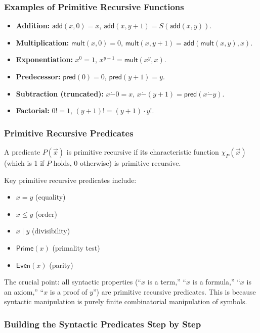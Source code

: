 \subsubsection*{Examples of Primitive Recursive Functions}

\begin{itemize}
\item \textbf{Addition:} $\mathsf{add}(x, 0) = x$, $\mathsf{add}(x, y+1) = S(\mathsf{add}(x, y))$.
\item \textbf{Multiplication:} $\mathsf{mult}(x, 0) = 0$, $\mathsf{mult}(x, y+1) = \mathsf{add}(\mathsf{mult}(x, y), x)$.
\item \textbf{Exponentiation:} $x^0 = 1$, $x^{y+1} = \mathsf{mult}(x^y, x)$.
\item \textbf{Predecessor:} $\mathsf{pred}(0) = 0$, $\mathsf{pred}(y+1) = y$.
\item \textbf{Subtraction (truncated):} $x \dot- 0 = x$, $x \dot- (y+1) = \mathsf{pred}(x \dot- y)$.
\item \textbf{Factorial:} $0! = 1$, $(y+1)! = (y+1) \cdot y!$.
\end{itemize}

\subsubsection*{Primitive Recursive Predicates}

A predicate $P(\vec{x})$ is primitive recursive if its characteristic function $\chi_P(\vec{x})$ (which is 1 if $P$ holds, 0 otherwise) is primitive recursive.

Key primitive recursive predicates include:
\begin{itemize}
\item $x = y$ (equality)
\item $x \le y$ (order)
\item $x \mid y$ (divisibility)
\item $\mathsf{Prime}(x)$ (primality test)
\item $\mathsf{Even}(x)$ (parity)
\end{itemize}

The crucial point: all syntactic properties (``$x$ is a term,'' ``$x$ is a formula,'' ``$x$ is an axiom,'' ``$x$ is a proof of $y$'') are primitive recursive predicates. This is because syntactic manipulation is purely finite combinatorial manipulation of symbols.

\subsubsection*{Building the Syntactic Predicates Step by Step}

